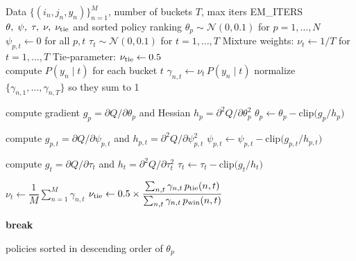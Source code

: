 \begin{algorithm}[ht]
\caption{EM for Fitting Model Parameters}
\label{alg:hybrid-em-full}
\begin{algorithmic}[1]
\Require Data $\{(i_n,j_n,y_n)\}_{n=1}^M$, number of buckets $T$, max iters \textsf{EM\_ITERS}
\Ensure $\theta,\;\psi,\;\tau,\;\nu,\;\nu_{\rm tie}$ and sorted policy ranking
\State\quad $\theta_p\sim\mathcal N(0,0.1)$ for $p=1,\dots,N$
\State\quad $\psi_{p,t}\gets0$ for all $p,t$
\State\quad $\tau_t\sim\mathcal N(0,0.1)$ for $t=1,\dots,T$
\State\quad Mixture weights: $\nu_t\gets 1/T$ for $t=1,\dots,T$
\State\quad Tie‐parameter: $\nu_{\rm tie}\gets 0.5$
 \\
    \State compute $P(y_n\mid t)$ for each bucket $t$
    \State $\gamma_{n,t}\gets \nu_t\,P(y_n\mid t)$
    \State normalize $\{\gamma_{n,1},\dots,\gamma_{n,T}\}$ so they sum to 1
  \EndFor

    \State compute gradient $g_p\!=\!\partial Q/\partial\theta_p$ and Hessian $h_p\!=\!\partial^2Q/\partial\theta_p^2$
    \State $\theta_p\gets \theta_p - \mathrm{clip}\bigl(g_p/h_p\bigr)$
  \EndFor

    \State compute $g_{p,t}\!=\!\partial Q/\partial\psi_{p,t}$ and $h_{p,t}\!=\!\partial^2Q/\partial\psi_{p,t}^2$
    \State $\psi_{p,t}\gets \psi_{p,t} - \mathrm{clip}\bigl(g_{p,t}/h_{p,t}\bigr)$
  \EndFor

    \State compute $g_t\!=\!\partial Q/\partial \tau_t$ and $h_t\!=\!\partial^2Q/\partial\tau_t^2$
    \State $\tau_t\gets \tau_t - \mathrm{clip}\bigl(g_t/h_t\bigr)$
  \EndFor

  \State\quad $\nu_t \gets \dfrac{1}{M}\sum_{n=1}^M \gamma_{n,t}$
  \State\quad $\nu_{\rm tie} \gets 0.5 \times \dfrac{\sum_{n,t}\gamma_{n,t}\,p_{\rm tie}(n,t)}{\sum_{n,t}\gamma_{n,t}\,p_{\rm win}(n,t)}$
  
    \State \textbf{break}
  \EndIf
\EndFor

\State \Return policies sorted in descending order of $\theta_p$
\end{algorithmic}
\end{algorithm}

